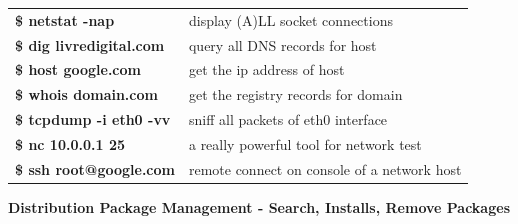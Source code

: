 \documentclass{beamer}
\begin{document}
\begin{frame}[t]
{\begin{minipage}[t]{.50\linewidth}
\begin{minipage}[t]{0.470\textwidth}
\begin{tabular}{l p{11cm} }
            \textbf{\$ netstat -nap} & display (A)LL socket connections\\
            \textbf{\$ dig livredigital.com} & query all DNS records for host\\
            \textbf{\$ host google.com} & get the ip address of host\\
            \textbf{\$ whois domain.com} & get the registry records for domain\\
            \textbf{\$ tcpdump -i eth0 -vv} & sniff all packets of eth0 interface\\
            \textbf{\$ nc 10.0.0.1 25} & a really powerful tool for network test\\
            \textbf{\$ ssh root@google.com} & remote connect on console of a network host\\
            \end{tabular}
        \end{minipage}
        
        \vspace{10pt}
        
        \begin{center}
        \textbf{Distribution Package Management - Search, Installs, Remove Packages}
        \end{center}
        

\end{minipage}}
\end{frame}
\end{document}
